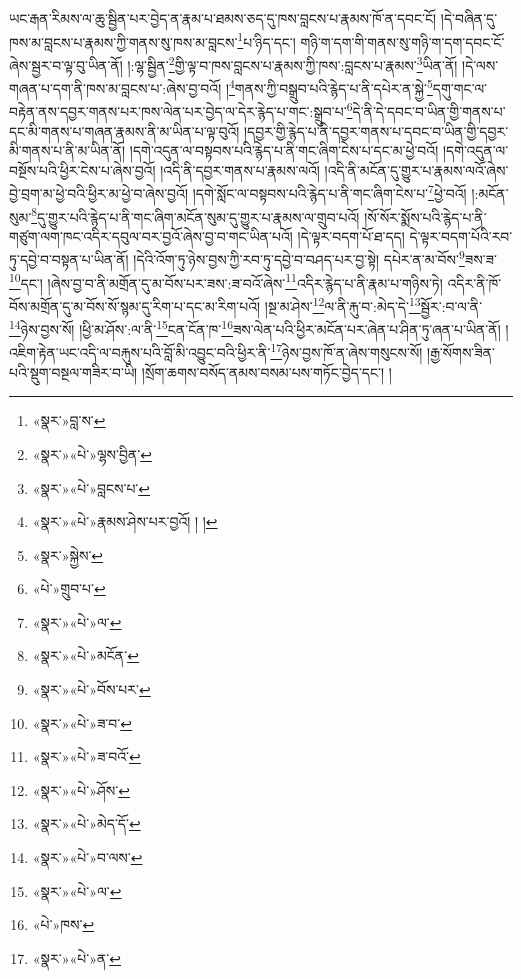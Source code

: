 ཡང་རྒན་རིམས་ལ་ཆུ་སྦྱིན་པར་བྱེད་ན་རྣམ་པ་ཐམས་ཅད་དུ་ཁས་བླངས་པ་རྣམས་ཁོ་ན་དབང་ངོ། །དེ་བཞིན་དུ་ཁས་མ་བླངས་པ་རྣམས་ཀྱི་གནས་སུ་ཁས་མ་བླངས་\footnote{«སྣར་»བླ་ས་}པ་ཉིད་དང་། གཉི་ག་དག་གི་གནས་སུ་གཉི་ག་དག་དབང་ངོ་ཞེས་སྦྱར་བ་ལྟ་བུ་ཡིན་ནོ། །:ལྷ་སྦྱིན་\footnote{«སྣར་»«པེ་»ལྷས་བྱིན་}གྱི་ལྟ་བ་ཁས་བླངས་པ་རྣམས་ཀྱི་ཁས་:བླངས་པ་རྣམས་\footnote{«སྣར་»«པེ་»བླངས་པ་}ཡིན་ནོ། །དེ་ལས་གཞན་པ་དག་ནི་ཁས་མ་བླངས་པ་:ཞེས་བྱ་བའོ། །\footnote{«སྣར་»«པེ་»རྣམས་ཤེས་པར་བྱའོ། ། །}གནས་ཀྱི་བསྒྲུབ་པའི་རྙེད་པ་ནི་དཔེར་ན་སྐྱེ་\footnote{«སྣར་»སྐྱེས་}དགུ་གང་ལ་བརྟེན་ནས་དབྱར་གནས་པར་ཁས་ལེན་པར་བྱེད་ལ་དེར་རྙེད་པ་གང་:སྒྲུབ་པ་\footnote{«པེ་»གྲུབ་པ་}དེ་ནི་དེ་དབང་བ་ཡིན་གྱི་གནས་པ་དང་མི་གནས་པ་གཞན་རྣམས་ནི་མ་ཡིན་པ་ལྟ་བུའོ། །དབྱར་གྱི་རྙེད་པ་ནི་དབྱར་གནས་པ་དབང་བ་ཡིན་གྱི་དབྱར་མི་གནས་པ་ནི་མ་ཡིན་ནོ། །དགེ་འདུན་ལ་བསྟབས་པའི་རྙེད་པ་ནི་གང་ཞིག་ངེས་པ་དང་མ་ཕྱེ་བའོ། །དགེ་འདུན་ལ་བསྔོས་པའི་ཕྱིར་ངེས་པ་ཞེས་བྱའོ། །འདི་ནི་དབྱར་གནས་པ་རྣམས་ལའོ། །འདི་ནི་མངོན་དུ་གྱུར་པ་རྣམས་ལའོ་ཞེས་བྱེ་བྲག་མ་ཕྱེ་བའི་ཕྱིར་མ་ཕྱེ་བ་ཞེས་བྱའོ། །དགེ་སློང་ལ་བསྟབས་པའི་རྙེད་པ་ནི་གང་ཞིག་ངེས་པ་\footnote{«སྣར་»«པེ་»ལ་}ཕྱེ་བའོ། །:མངོན་སུམ་\footnote{«སྣར་»«པེ་»མངོན་}དུ་གྱུར་པའི་རྙེད་པ་ནི་གང་ཞིག་མངོན་སུམ་དུ་གྱུར་པ་རྣམས་ལ་གྲུབ་པའོ། །སོ་སོར་སྨོས་པའི་རྙེད་པ་ནི་གཙུག་ལག་ཁང་འདིར་དབུལ་བར་བྱའོ་ཞེས་བྱ་བ་གང་ཡིན་པའོ། །དེ་ལྟར་བདག་པོ་ཐ་དད། དེ་ལྟར་བདག་པོའི་རབ་ཏུ་དབྱེ་བ་བསྟན་པ་ཡིན་ནོ། །དེའི་འོག་ཏུ་ཉེས་བྱས་ཀྱི་རབ་ཏུ་དབྱེ་བ་བཤད་པར་བྱ་སྟེ། དཔེར་ན་མ་བོས་\footnote{«སྣར་»«པེ་»བོས་པར་}ཟས་ཟ་\footnote{«སྣར་»«པེ་»ཟ་བ་}དང་། །ཞེས་བྱ་བ་ནི་མགྲོན་དུ་མ་བོས་པར་ཟས་:ཟ་བའོ་ཞེས་\footnote{«སྣར་»«པེ་»ཟ་བའོ་}འདིར་རྙེད་པ་ནི་རྣམ་པ་གཉིས་ཏེ། འདིར་ནི་ཁོ་བོས་མགྲོན་དུ་མ་བོས་སོ་སྙམ་དུ་རིག་པ་དང་མ་རིག་པའོ། །སྔ་མ་ཤེས་\footnote{«སྣར་»«པེ་»ཤོས་}ལ་ནི་རྐུ་བ་:མེད་དེ་\footnote{«སྣར་»«པེ་»མེད་དོ་}སྦྱོར་:བ་ལ་ནི་\footnote{«སྣར་»«པེ་»བ་ལས་}ཉེས་བྱས་སོ། །ཕྱི་མ་ཤོས་:ལ་ནི་\footnote{«སྣར་»«པེ་»ལ་}ངན་ངོན་ཁ་\footnote{«པེ་»ཁས་}ཟས་ལེན་པའི་ཕྱིར་མངོན་པར་ཞེན་པ་ཤིན་ཏུ་ཞན་པ་ཡིན་ནོ། །འཇིག་རྟེན་ཡང་འདི་ལ་བརྐུས་པའི་བློ་མི་འབྱུང་བའི་ཕྱིར་ནི་\footnote{«སྣར་»«པེ་»ན་}ཉེས་བྱས་ཁོ་ན་ཞེས་གསུངས་སོ། །རྒྱ་སོགས་ཟིན་པའི་སྡུག་བསྔལ་གཟིར་བ་ཡི། །སྲོག་ཆགས་བསོད་ནམས་བསམ་པས་གཏོང་བྱེད་དང་། །

